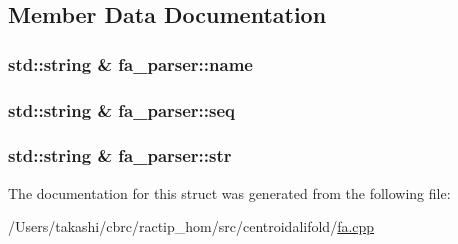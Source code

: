 \subsection{Member Data Documentation}
\hypertarget{structfa__parser_a1810d6ee1e514d5881b7533dc48aa255}{
\subsubsection[{name}]{\setlength{\rightskip}{0pt plus 5cm}std\+::string \& fa\+\_\+parser\+::name}}\label{structfa__parser_a1810d6ee1e514d5881b7533dc48aa255}
\hypertarget{structfa__parser_aa1da8bfd10cf6fcd917d552a1620aa7c}{
\subsubsection[{seq}]{\setlength{\rightskip}{0pt plus 5cm}std\+::string \& fa\+\_\+parser\+::seq}}\label{structfa__parser_aa1da8bfd10cf6fcd917d552a1620aa7c}
\hypertarget{structfa__parser_a8a5f4b32bd12a9c4aa27b5a8dc830c5c}{
\subsubsection[{str}]{\setlength{\rightskip}{0pt plus 5cm}std\+::string \& fa\+\_\+parser\+::str}}\label{structfa__parser_a8a5f4b32bd12a9c4aa27b5a8dc830c5c}


The documentation for this struct was generated from the following file\+:\begin{DoxyCompactItemize}
\item 
/\+Users/takashi/cbrc/ractip\+\_\+hom/src/centroidalifold/\hyperlink{centroidalifold_2fa_8cpp}{fa.\+cpp}\end{DoxyCompactItemize}
